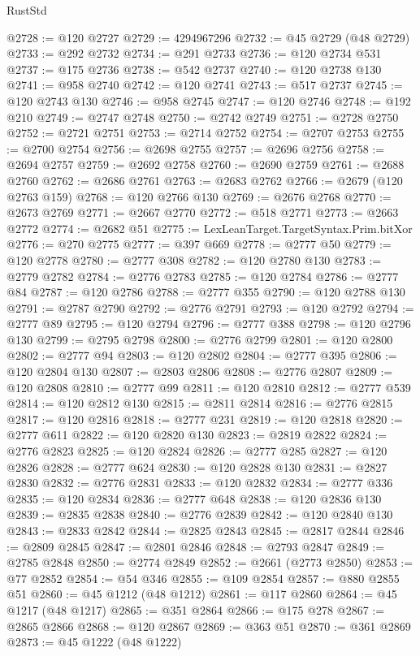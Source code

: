 \begin{lexlean}{RustStd}
\begin{coremodule}
@2728 := @120 @2727
@2729 := 4294967296
@2732 := @45 @2729 (@48 @2729)
@2733 := @292 @2732
@2734 := @291 @2733
@2736 := @120 @2734 @531
@2737 := @175 @2736
@2738 := @542 @2737
@2740 := @120 @2738 @130
@2741 := @958 @2740
@2742 := @120 @2741
@2743 := @517 @2737
@2745 := @120 @2743 @130
@2746 := @958 @2745
@2747 := @120 @2746
@2748 := @192 @210
@2749 := @2747 @2748
@2750 := @2742 @2749
@2751 := @2728 @2750
@2752 := @2721 @2751
@2753 := @2714 @2752
@2754 := @2707 @2753
@2755 := @2700 @2754
@2756 := @2698 @2755
@2757 := @2696 @2756
@2758 := @2694 @2757
@2759 := @2692 @2758
@2760 := @2690 @2759
@2761 := @2688 @2760
@2762 := @2686 @2761
@2763 := @2683 @2762
@2766 := @2679 (@120 @2763 @159)
@2768 := @120 @2766 @130
@2769 := @2676 @2768
@2770 := @2673 @2769
@2771 := @2667 @2770
@2772 := @518 @2771
@2773 := @2663 @2772
@2774 := @2682 @51
@2775 := LexLeanTarget.TargetSyntax.Prim.bitXor
@2776 := @270 @2775
@2777 := @397 @669
@2778 := @2777 @50
@2779 := @120 @2778
@2780 := @2777 @308
@2782 := @120 @2780 @130
@2783 := @2779 @2782
@2784 := @2776 @2783
@2785 := @120 @2784
@2786 := @2777 @84
@2787 := @120 @2786
@2788 := @2777 @355
@2790 := @120 @2788 @130
@2791 := @2787 @2790
@2792 := @2776 @2791
@2793 := @120 @2792
@2794 := @2777 @89
@2795 := @120 @2794
@2796 := @2777 @388
@2798 := @120 @2796 @130
@2799 := @2795 @2798
@2800 := @2776 @2799
@2801 := @120 @2800
@2802 := @2777 @94
@2803 := @120 @2802
@2804 := @2777 @395
@2806 := @120 @2804 @130
@2807 := @2803 @2806
@2808 := @2776 @2807
@2809 := @120 @2808
@2810 := @2777 @99
@2811 := @120 @2810
@2812 := @2777 @539
@2814 := @120 @2812 @130
@2815 := @2811 @2814
@2816 := @2776 @2815
@2817 := @120 @2816
@2818 := @2777 @231
@2819 := @120 @2818
@2820 := @2777 @611
@2822 := @120 @2820 @130
@2823 := @2819 @2822
@2824 := @2776 @2823
@2825 := @120 @2824
@2826 := @2777 @285
@2827 := @120 @2826
@2828 := @2777 @624
@2830 := @120 @2828 @130
@2831 := @2827 @2830
@2832 := @2776 @2831
@2833 := @120 @2832
@2834 := @2777 @336
@2835 := @120 @2834
@2836 := @2777 @648
@2838 := @120 @2836 @130
@2839 := @2835 @2838
@2840 := @2776 @2839
@2842 := @120 @2840 @130
@2843 := @2833 @2842
@2844 := @2825 @2843
@2845 := @2817 @2844
@2846 := @2809 @2845
@2847 := @2801 @2846
@2848 := @2793 @2847
@2849 := @2785 @2848
@2850 := @2774 @2849
@2852 := @2661 (@2773 @2850)
@2853 := @77 @2852
@2854 := @54 @346
@2855 := @109 @2854
@2857 := @880 @2855 @51
@2860 := @45 @1212 (@48 @1212)
@2861 := @117 @2860
@2864 := @45 @1217 (@48 @1217)
@2865 := @351 @2864
@2866 := @175 @278
@2867 := @2865 @2866
@2868 := @120 @2867
@2869 := @363 @51
@2870 := @361 @2869
@2873 := @45 @1222 (@48 @1222)

\end{coremodule}
\end{lexlean}
